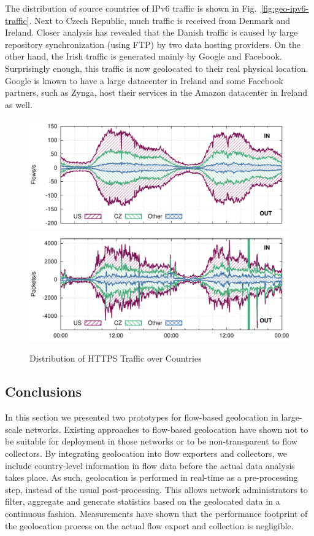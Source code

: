 The distribution of source countries of IPv6 traffic is shown in Fig.~\ref{fig:geo-ipv6-traffic}. Next to Czech Republic, much traffic is received from Denmark and Ireland. Closer analysis has revealed that the Danish traffic is caused by large repository synchronization (using FTP) by two data hosting providers. On the other hand, the Irish traffic is generated mainly by Google and Facebook. Surprisingly enough, this traffic is now geolocated to their real physical location. Google is known to have a large datacenter in Ireland and some Facebook partners, such as Zynga, host their services in the Amazon datacenter in Ireland as well.

\begin{figure}[!tb]
    \centering
    \includegraphics[width=\textwidth]{figures/paper-geolocation/https/flows}
    \includegraphics[width=\textwidth]{figures/paper-geolocation/https/packets}
    \caption{Distribution of HTTPS Traffic over Countries}
    \label{fig:geo-https-traffic}
\end{figure}

\subsection{Conclusions} \label{subsec:geo-conclusions}

In this section we presented two prototypes for flow-based geolocation in large-scale networks. Existing approaches to flow-based geolocation have shown not to be suitable for deployment in those networks or to be non-transparent to flow collectors. By integrating geolocation into flow exporters and collectors, we include country-level information in flow data before the actual data analysis takes place. As such, geolocation is performed in real-time as a pre-processing step, instead of the usual post-processing. This allows network administrators to filter, aggregate and generate statistics based on the geolocated data in a continuous fashion. Measurements have shown that the performance footprint of the geolocation process on the actual flow export and collection is negligible.

